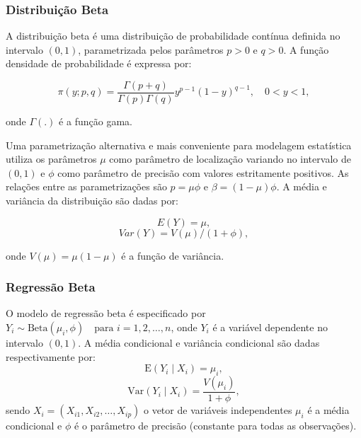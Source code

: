 \documentclass[12pt, a4paper]{article}
\begin{document}
\subsubsection{Distribuição Beta}
A distribuição beta é uma distribuição de probabilidade contínua definida no intervalo $(0,1)$, parametrizada pelos parâmetros $p > 0$ e $q > 0$. A função densidade de probabilidade é expressa por:

\begin{equation}
\pi(y; p, q) = \frac{\Gamma(p + q)}{\Gamma(p)\Gamma(q)}y^{p-1}(1 - y)^{q-1}, \quad 0 < y < 1,
\end{equation}

\setlength{\parindent}{0cm}
onde $\Gamma(.)$ é a função gama.
\setlength{\parindent}{1.25cm}

Uma parametrização alternativa e mais conveniente para modelagem estatística utiliza os parâmetros $\mu$ como parâmetro de localização variando no intervalo de $(0,1)$ e $\phi$ como parâmetro de precisão com valores estritamente positivos. As relações entre as parametrizações são $p = \mu \phi$ e $\beta = (1-\mu)\phi$. A média e variância da distribuição são dadas por: 

\begin{equation}
E(Y) = \mu,
\end{equation}
\begin{equation}
Var(Y) = V(\mu) / (1+\phi),
\end{equation}

\setlength{\parindent}{0cm}
onde $V(\mu) = \mu(1-\mu)$ é a função de variância.
\setlength{\parindent}{1.25cm}

\subsubsection{Regressão Beta}
O modelo de regressão beta é especificado por $Y_i \sim \text{Beta}(\mu_i, \phi) \quad \text{para } i = 1, 2, \dots, n$, onde $Y_i$ é a variável dependente no intervalo $(0,1)$. A média condicional e variância condicional são dadas respectivamente por:
\begin{equation}
\mathrm{E}(Y_i \mid X_i) = \mu_i,
\end{equation}
\begin{equation}
\mathrm{Var}(Y_i \mid X_i) = \frac{V(\mu_i)}{1+\phi}, 
\end{equation}
\setlength{\parindent}{0cm}
sendo $X_i = (X_{i1}, X_{i2}, \dots, X_{ip})$ o vetor de variáveis independentes $\mu_i$ é a média condicional e $\phi$ é o parâmetro de precisão (constante para todas as observações).
\setlength{\parindent}{1.25cm}
\end{document}
